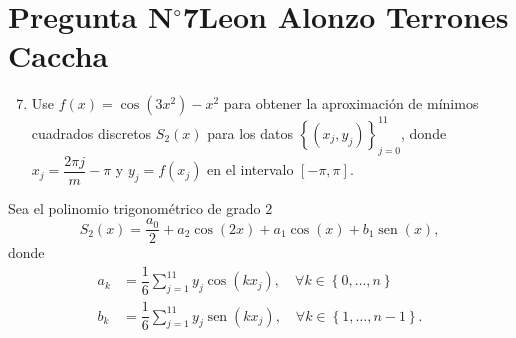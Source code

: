 \section{Pregunta N$^{\circ}$7\qquad Leon Alonzo Terrones Caccha}

\begin{frame}
    \begin{enumerate}\setcounter{enumi}{6}
        \item

              Use
              \begin{math}
                  f\left(x\right)=
                  \cos\left(3x^{2}\right)-
                  x^{2}
              \end{math}
              para obtener la aproximación de mínimos cuadrados
              discretos $S_{2}\left(x\right)$ para los datos
              \begin{math}
                  \left\{
                  \left(x_{j},y_{j}\right)
                  \right\}_{j=0}^{11}
              \end{math},
              donde $x_{j}=\dfrac{2\pi j}{m}-\pi$ y
              $y_{j}=f\left(x_{j}\right)$ en el intervalo
              $\left[-\pi,\pi\right]$.
    \end{enumerate}

    \begin{solution}
        Sea el polinomio trigonométrico de grado $2$
        \begin{equation*}
            S_{2}\left(x\right)=
            \dfrac{a_{0}}{2}+
            a_{2}\cos(2x)+
            a_{1}\cos\left(x\right)+
            b_{1}\operatorname{sen}\left(x\right),
        \end{equation*}
        donde
        \begin{align*}
            a_{k} & =
            \dfrac{1}{6}
            \sum_{j=1}^{11}
            y_{j}\cos\left(kx_{j}\right),\quad
            \forall k\in\left\{0,\dotsc,n\right\} \\
            b_{k} & =
            \dfrac{1}{6}
            \sum_{j=1}^{11}
            y_{j}
            \operatorname{sen}\left(kx_{j}\right),\quad
            \forall k\in\left\{1,\dotsc,n-1\right\}.
        \end{align*}
    \end{solution}
\end{frame}

